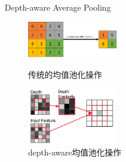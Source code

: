 \documentclass{beamer}
\begin{document}


\begin{frame}{Depth-aware Average Pooling}
\begin{figure}[h]
	\centering
	\begin{minipage}[t]{0.4\textwidth}
		\centering
		\includegraphics[width=4cm]{images/savg.png}
		\caption{\label{savg}传统的均值池化操作}
	\end{minipage}
	\begin{minipage}[t]{0.4\textwidth}
		\centering
		\includegraphics[width=4cm]{images/davg.png}
		\caption{\label{davg}depth-aware均值池化操作}
	\end{minipage}
\end{figure}
\end{frame}
\end{document}

